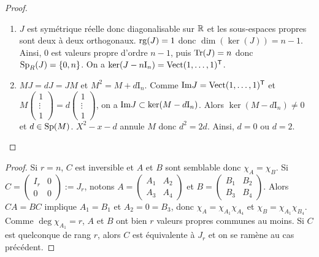 \documentclass[12pt]{article}
\begin{document}
\begin{proof}
	\phantom{}
	\begin{enumerate}
		\item $J$ est symétrique réelle donc diagonalisable sur $\mathbb{R}$ et les sous-espaces propres sont deux à deux orthogonaux. $\operatorname{rg}(J)=1$ donc $\dim(\ker(J))=n-1$. Ainsi, $0$ est valeurs propre d'ordre $n-1$, puis $\operatorname{Tr}(J)=n$ donc $\operatorname{Sp}_{R}(J)=\left\lbrace0,n\right\rbrace$. On a $\ker(J-n\mathrm{I}_n)=\operatorname{Vect}(1,\dots,1)^{\mathsf{T}}$.
		\item $MJ=dJ=JM$ et $M^{2}=M+d\mathrm{I}_n$. Comme $\mathrm{Im} J=\operatorname{Vect}(1,\dots,1)^{\mathsf{T}}$ et $M\begin{pmatrix}
			1\\\vdots\\1
		\end{pmatrix}=d\begin{pmatrix}
			1\\\vdots\\1
		\end{pmatrix}$, on a $\mathrm{Im} J\subset\ker(M-d\mathrm{I}_n)$. Alors $\ker(M-d\mathrm{I}_n)\neq0$ et $d\in\operatorname{Sp}(M)$. $X^{2}-x-d$ annule $M$ donc $d^{2}=2d$. Ainsi, $d=0$ ou $d=2$.
	\end{enumerate}
\end{proof}

\begin{proof}
	Si $r=n$, $C$ est inversible et $A$ et $B$ sont semblable donc $\chi_A=\chi_B$. Si $C=\begin{pmatrix}
		I_r&0\\0&0
	\end{pmatrix}:=J_r$, notons $A=\begin{pmatrix}
		A_1&A_2\\A_3&A_4
	\end{pmatrix}$ et $B=\begin{pmatrix}
		B_1&B_2\\B_3&B_4
	\end{pmatrix}$. Alors $CA=BC$ implique $A_1=B_1$ et $A_2=0=B_3$, donc $\chi_{A}=\chi_{A_1}\chi_{A_4}$ et $\chi_{B}=\chi_{A_1}\chi_{B_4}$. Comme $\deg\chi_{A_1}=r$, $A$ et $B$ ont bien $r$ valeurs propres communes au moins. Si $C$ est quelconque de rang $r$, alors $C$ est équivalente à $J_r$ et on se ramène au cas précédent.
\end{proof}
\end{document}
